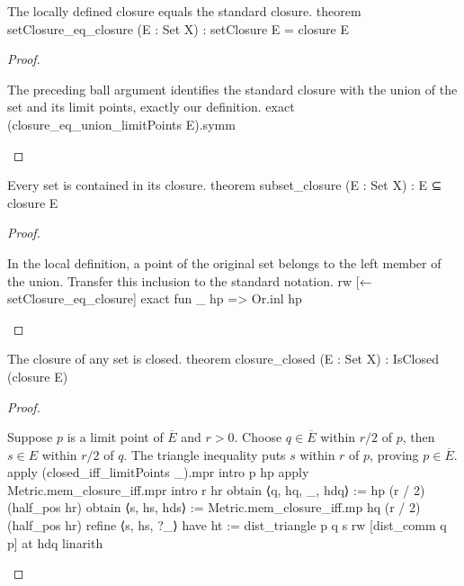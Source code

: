 \begin{lemma} \label{an1:lem:setClosure-eq-closure}
  \begin{lean}{The locally defined closure equals the standard closure.}
    theorem setClosure_eq_closure (E : Set X) : setClosure E = closure E
  \end{lean}
\end{lemma}

\begin{proof}
  \begin{lean}{The preceding ball argument identifies the standard closure with the union of the set and its limit points, exactly our definition.}
    exact (closure_eq_union_limitPoints E).symm
  \end{lean}

\end{proof}

\begin{lemma} \label{an1:lem:subset-closure}
  \begin{lean}{Every set is contained in its closure.}
    theorem subset_closure (E : Set X) : E ⊆ closure E
  \end{lean}
\end{lemma}

\begin{proof}
  \begin{lean}{In the local definition, a point of the original set belongs to the left member of the union. Transfer this inclusion to the standard notation.}
    rw [← setClosure_eq_closure]
    exact fun _ hp => Or.inl hp
  \end{lean}

\end{proof}

\begin{lemma} \label{an1:lem:closure-closed}
  \begin{lean}{The closure of any set is closed.}
    theorem closure_closed (E : Set X) : IsClosed (closure E)
  \end{lean}
\end{lemma}

\begin{proof}
  \begin{lean}{Suppose $p$ is a limit point of $\overline E$ and $r>0$. Choose $q\in\overline E$ within $r/2$ of $p$, then $s\in E$ within $r/2$ of $q$. The triangle inequality puts $s$ within $r$ of $p$, proving $p\in\overline E$.}
    apply (closed_iff_limitPoints _).mpr
    intro p hp
    apply Metric.mem_closure_iff.mpr
    intro r hr
    obtain ⟨q, hq, _, hdq⟩ := hp (r / 2) (half_pos hr)
    obtain ⟨s, hs, hds⟩ := Metric.mem_closure_iff.mp hq (r / 2) (half_pos hr)
    refine ⟨s, hs, ?_⟩
    have ht := dist_triangle p q s
    rw [dist_comm q p] at hdq
    linarith
  \end{lean}

\end{proof}

